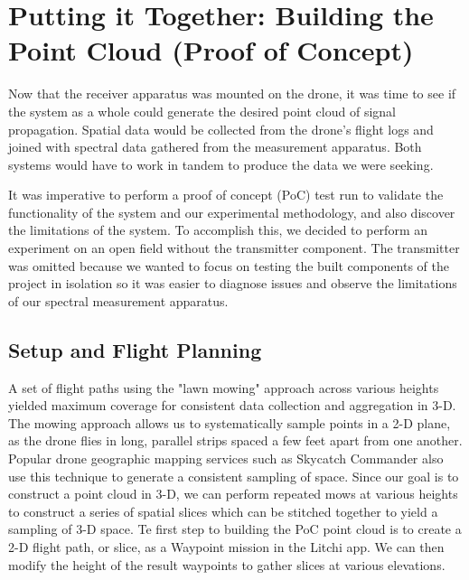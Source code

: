 \documentclass[pageno]{jpaper}
\begin{document}
 \section{Putting it Together: Building the Point Cloud (Proof of Concept)}
Now that the receiver apparatus was mounted on the drone, it was time to see if the system as a whole could generate the desired point cloud of signal propagation. Spatial data would be collected from the drone's flight logs and joined with spectral data gathered from the measurement apparatus. Both systems would have to work in tandem to produce the data we were seeking. 

It was imperative to perform a proof of concept (PoC) test run to validate the functionality of the system and our experimental methodology, and also discover the limitations of the system. To accomplish this, we decided to perform an experiment on an open field without the transmitter component. The transmitter was omitted because we wanted to focus on testing the built components of the project in isolation so it was easier to diagnose issues and observe the limitations of our spectral measurement apparatus. 

\subsection{Setup and Flight Planning}
A set of flight paths using the "lawn mowing" approach across various heights yielded maximum coverage for consistent data collection and aggregation in 3-D. The mowing approach allows us to systematically sample points in a 2-D plane, as the drone flies in long, parallel strips spaced a few feet apart from one another. Popular drone geographic mapping services such as Skycatch Commander also use this technique to generate a consistent sampling of space. Since our goal is to construct a point cloud in 3-D, we can perform repeated mows at various heights to construct a series of spatial slices which can be stitched together to yield a sampling of 3-D space. Te first step to building the PoC point cloud is to create a 2-D flight path, or slice, as a Waypoint mission in the Litchi app. We can then modify the height of the result waypoints to gather slices at various elevations.
\end{document}
